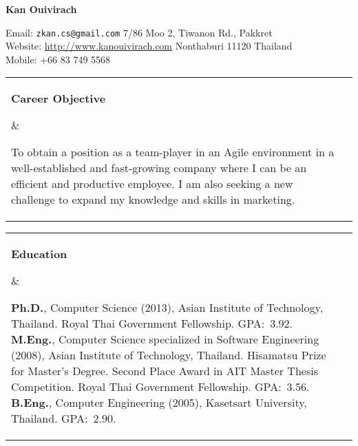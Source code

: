 \documentclass[11pt]{article}
\makeatletter
\newcommand{\mysection}[2]{
  \noindent
  \begin{tabular}{@{}ll@{}}
    \parbox[t]{1.0in}{ \raggedright \bf #1 } &
    \parbox[t]{5.0in}{ #2 }\\
    \hspace{0.2in}
  \end{tabular}
}
\makeatother
\begin{document}
 
\pagestyle{empty}
\thispagestyle{empty}

\begin{center}
  {\LARGE \bf \noindent Kan Ouivirach}
\end{center}

\vspace{0.1in}
\TPMargin{4pt}
\setlength{\TPHorizModule}{10pt}
\setlength{\TPVertModule}{10pt}


\noindent
Email: {\tt zkan.cs@gmail.com} \hfill 7/86 Moo 2, Tiwanon Rd., Pakkret\\
Website: \url{http://www.kanouivirach.com} \hfill Nonthaburi 11120 Thailand\\
Mobile: +66 83 749 5568

\noindent \hrulefill

\vspace{0.2in}


\mysection{Career Objective} {
  To obtain a position as a team-player in
  an Agile environment in a well-established and fast-growing company
  where I can be an efficient and productive employee.  I am also
  seeking a new challenge to expand my knowledge and skills in
  marketing.
}

\mysection{Education} {
  {\bf Ph.D.}, Computer Science (2013), Asian Institute of
  Technology, Thailand. Royal Thai Government Fellowship.  GPA:~3.92.\\

  {\bf M.Eng.}, Computer Science specialized in Software Engineering
  (2008), Asian Institute of Technology, Thailand.  Hisamatsu Prize for
  Master's Degree. Second Place Award in AIT Master Thesis
  Competition. Royal Thai Government Fellowship. GPA:~3.56.\\

  {\bf B.Eng.}, Computer Engineering (2005), Kasetsart University,
  Thailand. GPA:~2.90.
}
\end{document}
